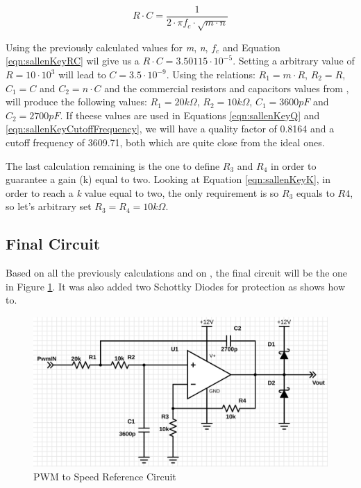 		\begin{equation}\label{eqn:sallenKeyRC}
			R \cdot C = \frac{1}{2 \cdot \pi f_{c} \cdot \sqrt{m \cdot n}}
		\end{equation}

		Using the previously calculated values for \textit{m}, \textit{n}, \textit{$f_{c}$} and Equation \ref{eqn:sallenKeyRC} wil give us a $R \cdot C = 3.50115 \cdot 10^{-5}$. Setting a arbitrary value of $R=10 \cdot 10^{3}$ will lead to $C=3.5 \cdot 10^{-9}$. Using the relations: $R_{1}= m \cdot R$, $R_{2}=R$, $C_{1}=C$ and $C_{2}= n \cdot C$ and the commercial resistors and capacitors values from \cite{burgess2015pwm}, will produce the following values: $R_{1}= 20k\Omega$, $R_{2}=10k\Omega$, $C_{1}=3600pF$ and $C_{2}= 2700pF$. If theese values are used in Equations \ref{eqn:sallenKeyQ} and \ref{eqn:sallenKeyCutoffFrequency}, we will have a  quality factor of 0.8164 and a cutoff frequency of 3609.71, both which are quite close from the ideal ones.
\par
		The last calculation remaining is the one to define $R_{3}$ and $R_{4}$ in order to guarantee a gain (k) equal to two. Looking at Equation \ref{eqn:sallenKeyK}, in order to reach a \textit{k} value equal to two, the only requirement is so $R_{3}$ equals to $R{4}$, so let's arbitrary set $R_{3}=R_{4}=10k\Omega$.

	\subsection{Final Circuit}

		Based on all the previously calculations and on \cite{texas1999sallenkey}, the final circuit will be the one in Figure \ref{fig:pwmToSpeedReferenceCircuit}. It was also added two Schottky Diodes for protection as \cite{walshAD} shows how to.

		\begin{figure}[htbp]
			\centering
				\includegraphics[scale=0.4]{figuras/fig-pwmToSpeedReferenceCircuit}
			\caption{PWM to Speed Reference Circuit}
			\label{fig:pwmToSpeedReferenceCircuit}
		\end{figure}


